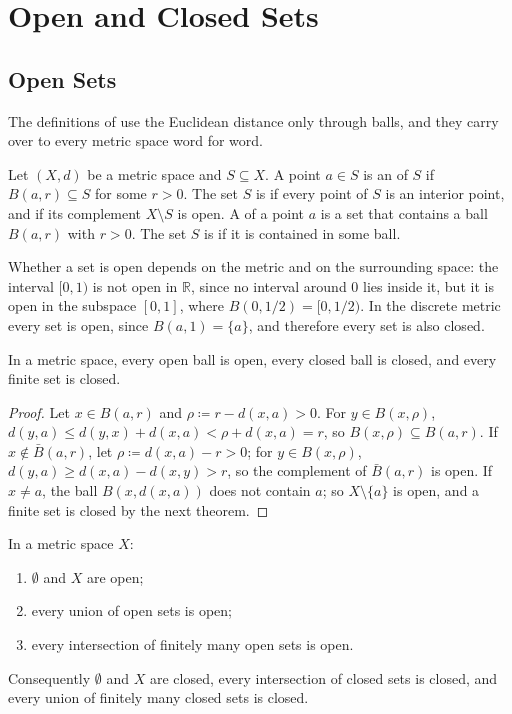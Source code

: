 \section{Open and Closed Sets}
\label{sec:open-closed}

\subsection{Open Sets}

The definitions of  use the Euclidean distance only through balls, and they carry over to every metric space word for word.

\begin{definition}
\label{def:open-closed-metric}
Let $(X,d)$ be a metric space and $S\subseteq X$. A point $a\in S$ is an  of $S$ if $B(a,r)\subseteq S$ for some $r>0$. The set $S$ is  if every point of $S$ is an interior point, and  if its complement $X\setminus S$ is open. A  of a point $a$ is a set that contains a ball $B(a,r)$ with $r>0$. The set $S$ is  if it is contained in some ball.
\end{definition}

Whether a set is open depends on the metric and on the surrounding space: the interval $[0,1)$ is not open in $\mathbb R$, since no interval around $0$ lies inside it, but it is open in the subspace $[0,1]$, where $B(0,1/2)=[0,1/2)$. In the discrete metric every set is open, since $B(a,1)=\{a\}$, and therefore every set is also closed.

\begin{proposition}
\label{prop:balls-open}
In a metric space, every open ball is open, every closed ball is closed, and every finite set is closed.
\end{proposition}

\begin{proof}
Let $x\in B(a,r)$ and $\rho\coloneqq r-d(x,a)>0$. For $y\in B(x,\rho)$, $d(y,a)\le d(y,x)+d(x,a)<\rho+d(x,a)=r$, so $B(x,\rho)\subseteq B(a,r)$. If $x\notin\bar B(a,r)$, let $\rho\coloneqq d(x,a)-r>0$; for $y\in B(x,\rho)$, $d(y,a)\ge d(x,a)-d(x,y)>r$, so the complement of $\bar B(a,r)$ is open. If $x\ne a$, the ball $B(x,d(x,a))$ does not contain $a$; so $X\setminus\{a\}$ is open, and a finite set is closed by the next theorem.
\end{proof}

\begin{theorem}
\label{thm:open-sets}
In a metric space $X$:
\begin{enumerate}
\item $\emptyset$ and $X$ are open;
\item every union of open sets is open;
\item every intersection of finitely many open sets is open.
\end{enumerate}
Consequently $\emptyset$ and $X$ are closed, every intersection of closed sets is closed, and every union of finitely many closed sets is closed.
\end{theorem}

